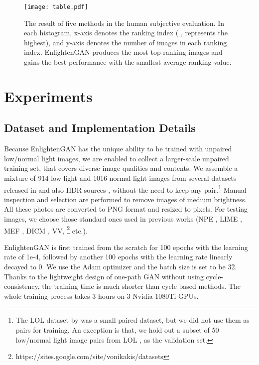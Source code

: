 \documentclass[journal]{IEEEtran}
\begin{document}
\begin{figure*}[!ht]
\centering
\texttt{[image: table.pdf]}
\caption{The result of five methods in the human subjective evaluation. In each histogram, x-axis denotes the ranking index (  ,  represents the highest), and y-axis denotes the number of images in each ranking index. EnlightenGAN produces the most top-ranking images and gains the best performance with the smallest average ranking value.}
\label{fig:table}
\end{figure*}









\section{Experiments}

\subsection{Dataset and Implementation Details}
\label{unpaired}
Because EnlightenGAN has the unique ability to be trained with unpaired low/normal light images, we are enabled to collect a larger-scale unpaired training set, that covers diverse image qualities and contents. We assemble a mixture of 914 low light and 1016 normal light images from several datasets released in \cite{dang2015raise,wei2018deep} and also HDR sources \cite{kalantari2017deep,cai2018learning}, without the need to keep any pair.\footnote{The LOL dataset by \cite{wei2018deep} was a small paired dataset, but we did not use them as pairs for training. An exception is that, we hold out a subset of 50 low/normal light image pairs from LOL \cite{wei2018deep}, as the validation set.} Manual inspection and selection are performed to remove images of medium brightness. All these photos are converted to PNG format and resized to  pixels. For testing images, we choose those standard ones used in previous works (NPE \cite{wang2013naturalness}, LIME \cite{guo2017lime}, MEF \cite{ma2015perceptual}, DICM \cite{lee2012contrast}, VV, \footnote{https://sites.google.com/site/vonikakis/datasets} etc.).












EnlightenGAN is first trained from the scratch for 100 epochs with the learning rate of 1e-4, followed by another 100 epochs with the learning rate linearly decayed to 0. We use the Adam optimizer and the batch size is set to be 32. Thanks to the lightweight design of one-path GAN without using cycle-consistency, the training time is much shorter than cycle based methods. The whole training process takes 3 hours on 3 Nvidia 1080Ti GPUs.
\end{document}
